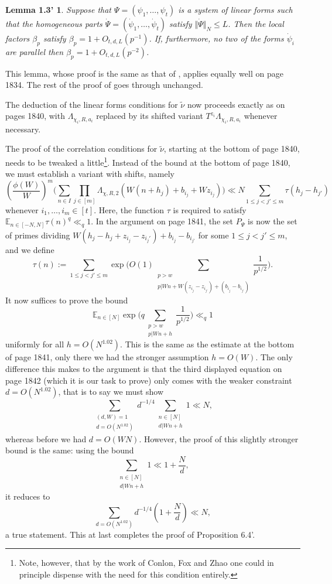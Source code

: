 \documentclass[12pt]{amsart}
\numberwithin{equation}{section}  %
\theoremstyle{remark}
\theoremstyle{plain}
\newtheorem*{lem13new}{Lemma 1.3'}
\numberwithin{equation}{section}
\newcommand{\E}{\mathbb{E}}  %
\renewcommand{\leq}{\leqslant}
\renewcommand{\(}{\left(}
\renewcommand{\)}{\right)}
\begin{document}
\begin{lem13new} Suppose that $\Psi = (\psi_1,\dots, \psi_t)$ is a system of linear forms such that the homogeneous parts $\dot\Psi = (\dot\psi_1,\dots,\dot\psi_t)$ satisfy $\Vert \dot\Psi\Vert_N \leq L$. Then the local factors $\beta_p$ satisfy $\beta_p = 1 + O_{t,d,L}(p^{-1})$. If, furthermore, no two of the forms $\dot\psi_i$ are parallel then $\beta_p = 1 + O_{t,d,L}(p^{-2})$.
\end{lem13new}

This lemma, whose proof is the same as that of \cite[Lemma 1.3]{gt-linearprimes}, applies equally well on page 1834. The rest of the proof of \cite[Theorem D.3]{gt-linearprimes} goes through unchanged.


The deduction of the linear forms conditions for $\tilde\nu$ now proceeds exactly as on pages 1840, with $\Lambda_{\chi_i,R,a_i}$ replaced by its shifted variant $T^{z_i} \Lambda_{\chi_i, R, a_i}$ whenever necessary.

The proof of the correlation conditions for $\tilde \nu$, starting at the bottom of page 1840, needs to be tweaked a little\footnote{Note, however, that by the work of Conlon, Fox and Zhao \cite{cfz} one could in principle dispense with the need for this condition entirely.}. Instead of the bound at the bottom of page 1840, we must establish a variant with shifts, namely
\[ \left(\frac{\phi(W)}{W}\right)^m \Bigg(\sum_{n \in I}\prod_{j \in [m]} \Lambda_{\chi, R, 2}(W(n + h_j)+ b_{i_j} + Wz_{i_j})  \Bigg) \ll N \sum_{1 \leq j < j' \leq m}\tau(h_j - h_{j'})\] whenever $i_1,\dots, i_m \in [t]$. Here, the function $\tau$ is required to satisfy $\E_{n \in [-N,N]} \tau(n)^q \ll_q 1$. In the argument on page 1841, the set $P_{\Psi}$ is now the set of primes dividing $W(h_j - h_{j} + z_{i_j} - z_{i_j'}) + b_{i_j} - b_{i_{j'}}$ for some $1 \leq j < j' \leq m$, and we define
\[ \tau(n) := \sum_{1 \leq j < j' \leq m} \exp \Bigg(O  (1)\sum_{\substack{p > w \\ p | Wn + W(z_{i_j} - z_{i_{j'}}) + (b_{i_j} - b_{i_{j'}})}} \frac{1}{p^{1/2} }\Bigg) .\]
It now suffices to prove the bound
\[ \E_{n \in [N]} \exp\Bigg(q \sum_{\substack{p > w \\ p | Wn + h}} \frac{1}{p^{1/2}}\Bigg) \ll_q 1\] uniformly for all $h = O(N^{1.02})$. This is the same as the estimate at the bottom of page 1841, only there we had the stronger assumption $h = O(W)$. The only difference this makes to the argument is that the third displayed equation on page 1842 (which it is our task to prove) only comes with the weaker constraint $d = O(N^{1.02})$, that is to say we must show
\[ \sum_{\substack{(d,W) = 1 \\ d = O(N^{1.02})}} d^{-1/4} \sum_{\substack{n \in [N] \\ d | Wn + h}} 1 \ll N,\] whereas before we had $d = O(WN)$. However, the proof of this slightly stronger bound is the same: using the bound
\[ \sum_{\substack{n \in [N] \\ d | Wn + h}} 1 \ll 1 + \frac{N}{d},\] it reduces to
\[ \sum_{d = O(N^{1.02})} d^{-1/4} \left(1 + \frac{N}{d}\right) \ll N,\] a true statement. This at last completes the proof of Proposition 6.4'.
\end{document}
